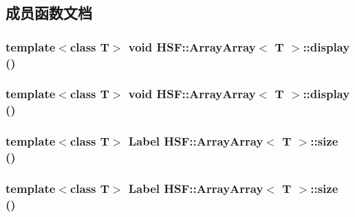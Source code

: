 \subsection{成员函数文档}
\hypertarget{classHSF_1_1ArrayArray_a7da595f942d46467f530f37db4402cb1}{
\subsubsection[{display}]{\setlength{\rightskip}{0pt plus 5cm}template$<$class T$>$ void {\bf HSF::ArrayArray}$<$ T $>$::display ()}}
\label{classHSF_1_1ArrayArray_a7da595f942d46467f530f37db4402cb1}
\hypertarget{classHSF_1_1ArrayArray_a7da595f942d46467f530f37db4402cb1}{
\subsubsection[{display}]{\setlength{\rightskip}{0pt plus 5cm}template$<$class T$>$ void {\bf HSF::ArrayArray}$<$ T $>$::display ()}}
\label{classHSF_1_1ArrayArray_a7da595f942d46467f530f37db4402cb1}
\hypertarget{classHSF_1_1ArrayArray_a448ad8105dac9e2f4bb69045430b9950}{
\subsubsection[{size}]{\setlength{\rightskip}{0pt plus 5cm}template$<$class T$>$ {\bf Label} {\bf HSF::ArrayArray}$<$ T $>$::size ()}}
\label{classHSF_1_1ArrayArray_a448ad8105dac9e2f4bb69045430b9950}
\hypertarget{classHSF_1_1ArrayArray_a448ad8105dac9e2f4bb69045430b9950}{
\subsubsection[{size}]{\setlength{\rightskip}{0pt plus 5cm}template$<$class T$>$ {\bf Label} {\bf HSF::ArrayArray}$<$ T $>$::size ()}}
\label{classHSF_1_1ArrayArray_a448ad8105dac9e2f4bb69045430b9950}



